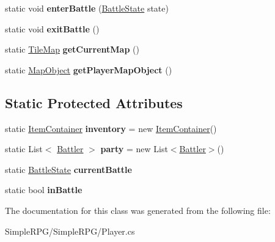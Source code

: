 \begin{DoxyCompactItemize}
\item 
\hypertarget{class_simple_r_p_g_1_1_player_a7aec54b7ef15deafa914d527d114469a}{static void {\bfseries enter\-Battle} (\hyperlink{class_simple_r_p_g_1_1_states_1_1_battle_state}{Battle\-State} state)}\label{class_simple_r_p_g_1_1_player_a7aec54b7ef15deafa914d527d114469a}

\item 
\hypertarget{class_simple_r_p_g_1_1_player_aff4884b53318855e75365140b7434207}{static void {\bfseries exit\-Battle} ()}\label{class_simple_r_p_g_1_1_player_aff4884b53318855e75365140b7434207}

\item 
\hypertarget{class_simple_r_p_g_1_1_player_a8edf5d5ae84cb45e8385648e94b7e282}{static \hyperlink{class_simple_r_p_g_1_1_tile_map}{Tile\-Map} {\bfseries get\-Current\-Map} ()}\label{class_simple_r_p_g_1_1_player_a8edf5d5ae84cb45e8385648e94b7e282}

\item 
\hypertarget{class_simple_r_p_g_1_1_player_a8e2d576fb81f9b3d0aab1dd2aa044a38}{static \hyperlink{class_simple_r_p_g_1_1_map_object}{Map\-Object} {\bfseries get\-Player\-Map\-Object} ()}\label{class_simple_r_p_g_1_1_player_a8e2d576fb81f9b3d0aab1dd2aa044a38}

\end{DoxyCompactItemize}
\subsection*{Static Protected Attributes}
\begin{DoxyCompactItemize}
\item 
\hypertarget{class_simple_r_p_g_1_1_player_a64192a3f860c47d7a67fc885dbb8ffcd}{static \hyperlink{class_simple_r_p_g_1_1_items_1_1_item_container}{Item\-Container} {\bfseries inventory} = new \hyperlink{class_simple_r_p_g_1_1_items_1_1_item_container}{Item\-Container}()}\label{class_simple_r_p_g_1_1_player_a64192a3f860c47d7a67fc885dbb8ffcd}

\item 
\hypertarget{class_simple_r_p_g_1_1_player_a254855437c04bc8cbc74d63225b05bfe}{static List$<$ \hyperlink{class_simple_r_p_g_1_1_battler}{Battler} $>$ {\bfseries party} = new List$<$\hyperlink{class_simple_r_p_g_1_1_battler}{Battler}$>$()}\label{class_simple_r_p_g_1_1_player_a254855437c04bc8cbc74d63225b05bfe}

\item 
\hypertarget{class_simple_r_p_g_1_1_player_ae0505ca43ca1a20072a8e37d15781dda}{static \hyperlink{class_simple_r_p_g_1_1_states_1_1_battle_state}{Battle\-State} {\bfseries current\-Battle}}\label{class_simple_r_p_g_1_1_player_ae0505ca43ca1a20072a8e37d15781dda}

\item 
\hypertarget{class_simple_r_p_g_1_1_player_a11408cf2aa03f42e794c168c3ff996b6}{static bool {\bfseries in\-Battle}}\label{class_simple_r_p_g_1_1_player_a11408cf2aa03f42e794c168c3ff996b6}

\end{DoxyCompactItemize}


The documentation for this class was generated from the following file\-:\begin{DoxyCompactItemize}
\item 
Simple\-R\-P\-G/\-Simple\-R\-P\-G/Player.\-cs\end{DoxyCompactItemize}
